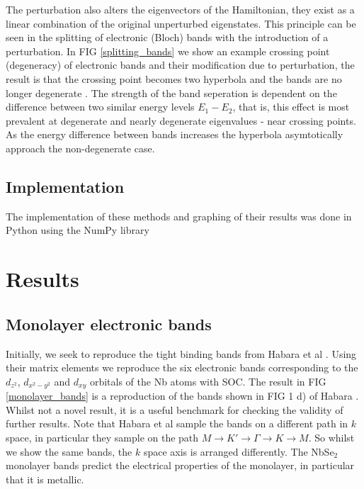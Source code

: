 \documentclass[12pt]{report} %
\begin{document}
The perturbation also alters the eigenvectors of the Hamiltonian, they exist as a linear combination of the original unperturbed eigenstates. This principle can be seen in the splitting of electronic (Bloch) bands with the introduction of a perturbation. In FIG \ref{splitting_bands} we show an example crossing point (degeneracy) of electronic bands and their modification due to perturbation, the result is that the crossing point becomes two hyperbola and the bands are no longer degenerate \cite{Cohen-Tannoudji2006, Verhoeven1996}. The strength of the band seperation is dependent on the difference between two similar energy levels $E_1 - E_2$, that is, this effect is most prevalent at degenerate and nearly degenerate eigenvalues - near crossing points. As the energy difference between bands increases the hyperbola asymtotically approach the non-degenerate case.

\subsection*{Implementation}
The implementation of these methods and graphing of their results was done in Python using the NumPy library

\section*{Results}

\subsection*{Monolayer electronic bands}
Initially, we seek to reproduce the tight binding bands from Habara et al \cite{Habara2021}. Using their matrix elements we reproduce the six electronic bands corresponding to the $d_{z^2}$, $d_{x^2 - y^2}$ and $d_{xy}$ orbitals of the Nb atoms with SOC. The result in FIG \ref{monolayer_bands} is a reproduction of the bands shown in FIG 1 d) of Habara \cite{Habara2021}. Whilst not a novel result, it is a useful benchmark for checking the validity of further results. Note that Habara et al sample the bands on a different path in $k$ space, in particular they sample on the path  $M \rightarrow K' \rightarrow \Gamma \rightarrow K \rightarrow M$. So whilst we show the same bands, the $k$ space axis is arranged differently. The NbSe$_2$ monolayer bands predict the electrical properties of the monolayer, in particular that it is metallic.
\end{document}
